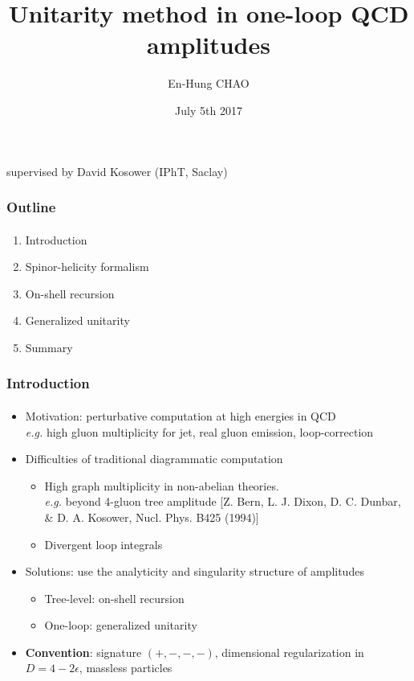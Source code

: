 \documentclass[english]{beamer}
\title{Unitarity method in one-loop QCD amplitudes}
\author{En-Hung CHAO}
\institute{{\'E}cole Normale Sup{\'e}rieure}
\date{July 5th 2017}
\newcommand{\eg}{\textit{e.g. }}
\begin{document}

\begin{frame}
\titlepage%
\centerline{supervised by David Kosower (IPhT, Saclay)}
\end{frame}
\begin{frame}
\frametitle{Outline}
\framesubtitle{}

\begin{enumerate}

\item Introduction
\item Spinor-helicity formalism
\item On-shell recursion
\item Generalized unitarity
\item Summary

\end{enumerate}

\end{frame}
\begin{frame}
\frametitle{Introduction}
\framesubtitle{}

\begin{itemize}
\item<1-> Motivation: perturbative computation at high energies in QCD \\ \eg high gluon multiplicity for jet, real gluon emission, loop-correction
\item<2-> Difficulties of traditional diagrammatic computation
    \begin{itemize}
    \item<3-> High graph multiplicity in non-abelian theories. \\ \eg beyond 4-gluon tree amplitude \tiny\color{blue}[Z. Bern, L. J. Dixon, D. C. Dunbar, \& D. A. Kosower, Nucl. Phys. B425 (1994)]\color{black}\normalsize
    \item<4-> Divergent loop integrals
    \end{itemize}
\item<5-> Solutions: use the analyticity and singularity structure of amplitudes
    \begin{itemize}
    \item<6-> Tree-level: on-shell recursion
    \item<7-> One-loop: generalized unitarity
    \end{itemize}
\item<8-> \textbf{Convention}: signature $(+,-,-,-)$, dimensional regularization in $D=4-2\epsilon$, massless particles
\end{itemize}
\end{frame}
\end{document}
